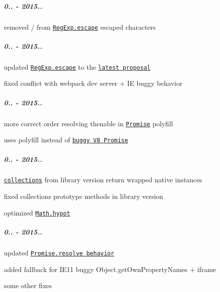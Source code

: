 \subparagraph*{0.. -\/ 2015..}


\begin{DoxyItemize}
\item removed {\ttfamily /} from \href{https://github.com/zloirock/core-js/#ecmascript-7}{\tt {\ttfamily Reg\+Exp.\+escape}} escaped characters
\end{DoxyItemize}

\subparagraph*{0.. -\/ 2015..}


\begin{DoxyItemize}
\item updated \href{https://github.com/zloirock/core-js/#ecmascript-7}{\tt {\ttfamily Reg\+Exp.\+escape}} to the \href{https://github.com/benjamingr/RexExp.escape}{\tt latest proposal}
\item fixed conflict with webpack dev server + IE buggy behavior
\end{DoxyItemize}

\subparagraph*{0.. -\/ 2015..}


\begin{DoxyItemize}
\item more correct order resolving thenable in \href{https://github.com/zloirock/core-js/#ecmascript-6-promise}{\tt {\ttfamily Promise}} polyfill
\item uses polyfill instead of \href{https://github.com/zloirock/core-js/issues/78}{\tt buggy V8 {\ttfamily Promise}}
\end{DoxyItemize}

\subparagraph*{0.. -\/ 2015..}


\begin{DoxyItemize}
\item \href{https://github.com/zloirock/core-js/#ecmascript-6-collections}{\tt collections} from {\ttfamily library} version return wrapped native instances
\item fixed collections prototype methods in {\ttfamily library} version
\item optimized \href{https://github.com/zloirock/core-js/#ecmascript-6-math}{\tt {\ttfamily Math.\+hypot}}
\end{DoxyItemize}

\subparagraph*{0.. -\/ 2015..}


\begin{DoxyItemize}
\item updated \href{https://esdiscuss.org/topic/fixing-promise-resolve}{\tt {\ttfamily Promise.\+resolve} behavior}
\item added fallback for I\+E11 buggy {\ttfamily Object.\+get\+Own\+Property\+Names} + iframe
\item some other fixes
\end{DoxyItemize}

